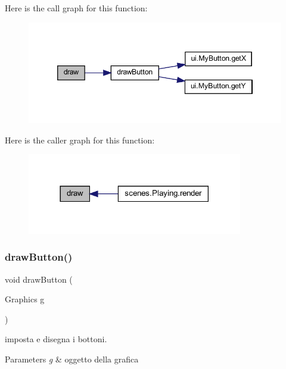 Here is the call graph for this function\+:\nopagebreak
\begin{figure}[H]
\begin{center}
\leavevmode
\includegraphics[width=346pt]{classui_1_1_level_menu_a72fe1ffca978e99fd16994a10e7f8051_cgraph}
\end{center}
\end{figure}
Here is the caller graph for this function\+:\nopagebreak
\begin{figure}[H]
\begin{center}
\leavevmode
\includegraphics[width=266pt]{classui_1_1_level_menu_a72fe1ffca978e99fd16994a10e7f8051_icgraph}
\end{center}
\end{figure}
\mbox{\label{classui_1_1_level_menu_a65768678909bc0512c6cb9780709ad38}} 
\subsubsection{\texorpdfstring{draw\+Button()}{drawButton()}}
{\footnotesize\ttfamily void draw\+Button (\begin{DoxyParamCaption}\item[{Graphics}]{g }\end{DoxyParamCaption})}



imposta e disegna i bottoni. 


\begin{DoxyParams}{Parameters}
{\em g} & oggetto della grafica \\
\hline
\end{DoxyParams}



